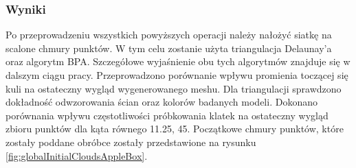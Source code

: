 \subsubsection{Wyniki}
Po przeprowadzeniu wszystkich powyższych operacji należy nałożyć siatkę na scalone chmury punktów. W tym celu zostanie użyta triangulacja Delaunay'a oraz algorytm BPA. Szczegółowe wyjaśnienie obu tych algorytmów znajduje się w dalszym ciągu pracy. Przeprowadzono porównanie wpływu promienia toczącej się kuli na ostateczny wygląd wygenerowanego meshu. Dla triangulacji sprawdzono dokładność odwzorowania ścian oraz kolorów badanych modeli. Dokonano porównania wpływu częstotliwości próbkowania klatek na ostateczny wygląd zbioru punktów dla kąta równego 11.25\degree, 45\degree. Początkowe chmury punktów, które zostały poddane obróbce zostały przedstawione na rysunku \ref{fig:globalInitialCloudsAppleBox}. 
